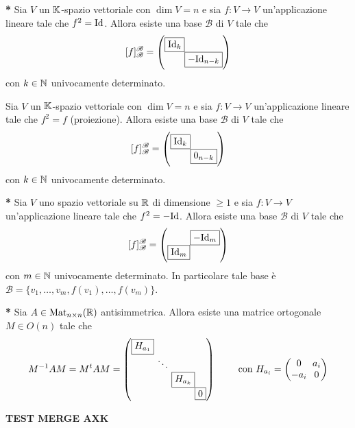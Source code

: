 
\begin{thm} \textbf{*}
	Sia $ V $ un $ \mathbb{K} $-spazio vettoriale con $ \dim{V} = n $ e sia $ f \colon V \to V $ un'applicazione lineare tale che $ f^{2} = \mathrm{Id} $. Allora esiste una base $ \mathscr{B} $ di $ V $ tale che 
	\[[f]_{\mathscr{B}}^{\mathscr{B}} = 
	\setlength{\arraycolsep}{0pt}
	\begin{pmatrix}
	\fbox{$ \Id_k $} & \\
	& \fbox{$ -\Id_{n - k} $}
	\end{pmatrix}\]
	con $ k \in \mathbb{N} $ univocamente determinato.
\end{thm}

\begin{thm}
	Sia $ V $ un $ \mathbb{K} $-spazio vettoriale con $ \dim{V} = n $ e sia $ f \colon V \to V $ un'applicazione lineare tale che $ f^{2} = f $ (proiezione). Allora esiste una base $ \mathscr{B} $ di $ V $ tale che 
	\[[f]_{\mathscr{B}}^{\mathscr{B}} = 
	\setlength{\arraycolsep}{0pt}
	\begin{pmatrix}
	\fbox{$ \Id_k $} & \\
	& \fbox{$ 0_{n - k} $}
	\end{pmatrix}\]
	con $ k \in \mathbb{N} $ univocamente determinato.
\end{thm}

\begin{thm} \textbf{*}
	Sia $ V $ uno spazio vettoriale su $ \mathbb{R} $ di dimensione $ \geq 1 $ e sia $ f \colon V \to V $ un'applicazione lineare tale che $ f^{2} = - \mathrm{Id} $. Allora esiste una base $ \mathscr{B} $ di $ V $ tale che 
	\[[f]_{\mathscr{B}}^{\mathscr{B}} = 
	\setlength{\arraycolsep}{0pt}
	\begin{pmatrix}
	& \fbox{$ -\Id_m $}\\
	\fbox{$ \Id_m $} & 
	\end{pmatrix}\]
	con $ m \in \mathbb{N} $ univocamente determinato. In particolare tale base è $ \mathscr{B} = \{v_1, \ldots, v_m, f(v_1), \ldots, f(v_m)\} $.
\end{thm}

\begin{thm} \textbf{*}
	Sia $ A \in \mathrm{Mat}_{n \times n}(\mathbb{R}) $ antisimmetrica. Allora esiste una matrice ortogonale $ M \in O(n) $ tale che 
	\[M^{-1} A M = M^{t} A M = 
	\setlength{\arraycolsep}{0pt}
	\begin{pmatrix}
	\fbox{$ H_{a_1} $} & & &\\
	& \ \ddots \ & & \\
	& & \fbox{$ H_{a_k} $} & \\
	& & & \fbox{$ 0 $}
	\end{pmatrix}
	\qquad
	\text{ con }
	H_{a_i} = 
	\setlength{\arraycolsep}{3pt}
	\begin{pmatrix}
	0 & a_{i} \\
	-a_{i} & 0
	\end{pmatrix}\]
\end{thm}

\begin{center}
	\textbf{TEST MERGE AXK}
\end{center}